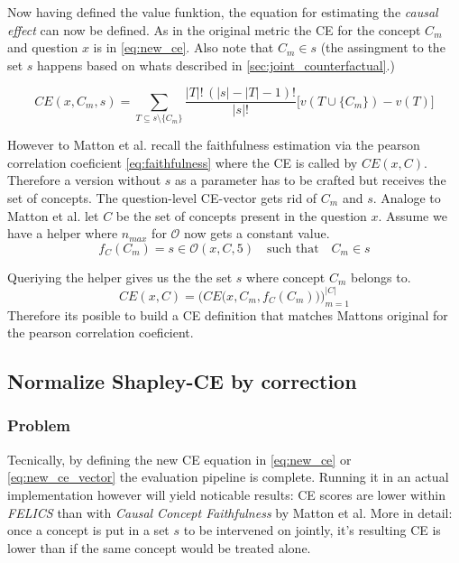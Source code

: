 Now having defined the value funktion, the equation for estimating the \emph{causal effect} can now be defined. As in the original metric the CE for the concept $C_m$ and question $x$ is in \ref{eq:new_ce}. Also note that $C_m \in s$ (the assingment to the set $s$ happens based on whats described in \ref{sec:joint_counterfactual}.)

\begin{equation}
\label{eq:new_ce}
CE(x,C_m, s)=
\sum_{T \subseteq s \setminus \{C_m\}} \frac{|T|!\, (|s|-|T|-1)!}{|s|!} \big[ v(T \cup \{C_m\}) - v(T) \big]
\end{equation}

However to Matton et al. recall the faithfulness estimation via the pearson correlation coeficient \ref{eq:faithfulness} where the CE is called by $CE(x,C)$. Therefore a version without $s$ as a parameter has to be crafted but receives the set of concepts. The question-level CE-vector gets rid of $C_m$ and $s$. Analoge to Matton et al. let $C$ be the set of concepts present in the question $x$. Assume we have a helper where $n_{max}$ for $\mathcal{O}$ now gets a constant value.
\begin{equation}
\label{eq:new_ce_vector}
f_C(C_m) = s \in \mathcal{O}(x, C, 5) \quad \text{such that} \quad C_m \in s
\end{equation}

Queriying the helper gives us the the set $s$ where concept $C_m$ belongs to.
\begin{equation}
    CE(x, C) = \Big( CE\big(x, C_m, f_C(C_m)\big) \Big)_{m=1}^{|C|}
\end{equation}
Therefore its posible to build a CE definition that matches Mattons original for the pearson correlation coeficient.
\subsection{Normalize Shapley-CE by correction}
\subsubsection{Problem}
Tecnically, by defining the new CE equation in \ref{eq:new_ce} or \ref{eq:new_ce_vector} the evaluation pipeline is complete. Running it in an actual implementation however will yield noticable results: CE scores are lower within \emph{FELICS} than with \emph{Causal Concept Faithfulness} by Matton et al. More in detail: once a concept is put in a set $s$ to be intervened on jointly, it's resulting CE is lower than if the same concept would be treated alone.

